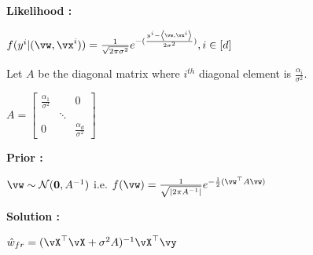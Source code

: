 \documentclass[a4paper,11pt]{article}
\begin{document}
\begin{mlsolution}

\textbf{Likelihood : }\par
$f(y^{i} | (\vw, \vx^i) )= \frac{1}{\sqrt{2\pi\sigma^2}}e^{-(\frac{y^{i} -\ip{\vw}{\vx^i}}{2\sigma^2})} , i\in[d]$\par
\vspace{0.25cm}

Let $A$ be the diagonal matrix where $i^{th}$ diagonal element is $\frac{\alpha_i}{\sigma^2}$.\par
$A = \begin{bmatrix}
    \frac{\alpha_{1}}{\sigma^2} & & 0\\
    & \ddots & \\
    0 & & \frac{\alpha_{d}}{\sigma^2}
  \end{bmatrix}$
\vspace{0.25cm}\par
\textbf{Prior : }\par
$\vw \sim \mathcal{N}(\textbf{0}, A^{-1}) $ i.e. $f(\vw) = \frac{1}{\sqrt{|2\pi A^{-1}|}}e^{-\frac{1}{2}(\vw^{\top}A\vw)}$\par
\vspace{0.25cm}
\textbf{Solution :}\par
$\hat{w}_{fr} = (\vX^{\top}\vX + \sigma^2 A)^{-1}\vX^{\top}\vy$

\end{mlsolution}
\end{document}
